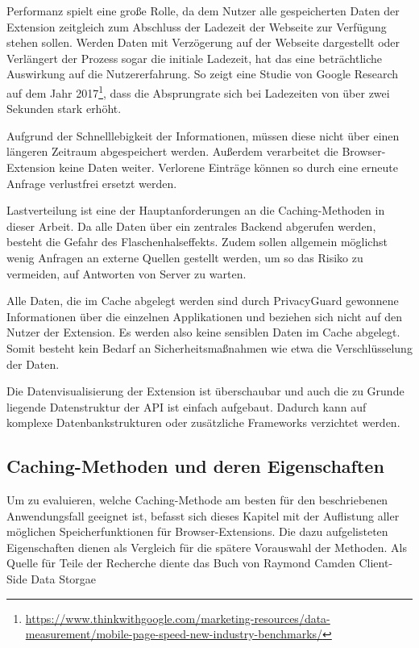 Performanz spielt eine große Rolle, da dem Nutzer alle gespeicherten Daten der Extension zeitgleich zum Abschluss der Ladezeit der Webseite zur Verfügung stehen sollen. Werden Daten mit Verzögerung auf der Webseite dargestellt oder Verlängert der Prozess sogar die initiale Ladezeit, hat das eine beträchtliche Auswirkung auf die Nutzererfahrung. So zeigt eine Studie von Google Research auf dem Jahr 2017\footnote{\url{https://www.thinkwithgoogle.com/marketing-resources/data-measurement/mobile-page-speed-new-industry-benchmarks/}}, dass die Absprungrate sich bei Ladezeiten von über zwei Sekunden stark erhöht.

Aufgrund der Schnelllebigkeit der Informationen, müssen diese nicht über einen längeren Zeitraum abgespeichert werden. Außerdem verarbeitet die Browser-Extension keine Daten weiter. Verlorene Einträge können so durch eine erneute Anfrage verlustfrei ersetzt werden. 

Lastverteilung ist eine der Hauptanforderungen an die Caching-Methoden in dieser Arbeit. Da alle Daten über ein zentrales Backend abgerufen werden, besteht die Gefahr des Flaschenhalseffekts. Zudem sollen allgemein möglichst wenig Anfragen an externe Quellen gestellt werden, um so das Risiko zu vermeiden, auf Antworten von Server zu warten.

Alle Daten, die im Cache abgelegt werden sind durch PrivacyGuard gewonnene Informationen über die einzelnen Applikationen und beziehen sich nicht auf den Nutzer der Extension. Es werden also keine sensiblen Daten im Cache abgelegt. Somit besteht kein Bedarf an Sicherheitsmaßnahmen wie etwa die Verschlüsselung der Daten.

Die Datenvisualisierung der Extension ist überschaubar und auch die zu Grunde liegende Datenstruktur der API ist einfach aufgebaut. Dadurch kann auf komplexe Datenbankstrukturen oder zusätzliche Frameworks verzichtet werden.

\subsection{Caching-Methoden und deren Eigenschaften}
\label{ss:methodeneigenschaften}

Um zu evaluieren, welche Caching-Methode am besten für den beschriebenen Anwendungsfall geeignet ist, befasst sich dieses Kapitel mit der Auflistung aller möglichen Speicherfunktionen für Browser-Extensions. Die dazu aufgelisteten Eigenschaften dienen als Vergleich für die spätere Vorauswahl der Methoden.
Als Quelle für Teile der Recherche diente das Buch von Raymond Camden \glqq Client-Side Data Storgae \grqq{}


